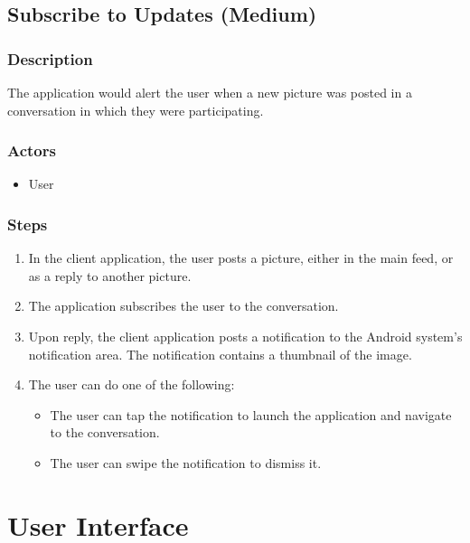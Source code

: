 \documentclass[11pt]{scrartcl}
\let\stdsection\section
\renewcommand\section{\newpage\stdsection}
\begin{document}
    \subsection{Subscribe to Updates (Medium)}
    \label{sec:subscribe}
        \subsubsection{Description}
            The application would alert the user when a new picture was posted in a conversation in which they were participating.
        \subsubsection{Actors}
            \begin{itemize}
                \item User
            \end{itemize}
        \subsubsection{Steps}
            \begin{enumerate}
                \item In the client application, the user posts a picture, either in the main feed, or as a reply to another picture.
                \item The application subscribes the user to the conversation.
                \item Upon reply, the client application posts a notification to the Android system's notification area.  The notification contains a thumbnail of the image.
                \item The user can do one of the following:
                \begin{itemize}
                    \item The user can tap the notification to launch the application and navigate to the conversation.
                    \item The user can swipe the notification to dismiss it.
                \end{itemize}
            \end{enumerate}

\appendix

\clearpage
\section{User Interface}
\end{document}
